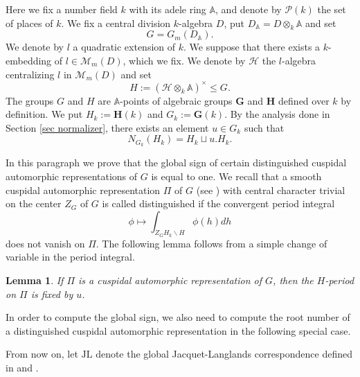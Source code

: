 \documentclass[11pt,letterpaper]{amsart}
\newcommand{\BA}{{\mathbb {A}}} \newcommand{\BB}{{\mathbb {B}}}\newcommand{\BC}{{\mathbb {C}}} \newcommand{\BD}{{\mathbb {D}}}
\newcommand{\CM}{{\mathcal {M}}} \newcommand{\CN}{{\mathcal {N}}}\newcommand{\CO}{{\mathcal {O}}}\newcommand{\CP}{{\mathcal {P}}}
\newcommand{\JL}{{\mathrm{JL}}}
\theoremstyle{plain}
\newtheorem{lem}[thm]{Lemma}  \newtheorem{prop}[thm]{Proposition}
\numberwithin{equation}{section}
\begin{document}
Here we fix a number field $k$ with its adele ring $\BA$, and denote by $\CP(k)$ the set of places of $k$. We fix a central division $k$-algebra $D$, put $D_{\BA}=D\otimes_k \BA$ and set \[G=G_m(D_\BA).\] We denote by $l$ a quadratic extension of $k$. We suppose that there exists a $k$-embedding of $l \in \CM_m(D)$, which we fix. 
We denote by $\mathcal{H}$ the $l$-algebra centralizing $l$ in $\CM_m(D)$ and set \[H:=(\mathcal{H}\otimes_k\BA)^\times\leq G.\] The groups $G$ and $H$ are $\BA$-points of algebraic groups $\mathbf{G}$ and $\mathbf{H}$ defined over $k$ by definition. We put 
$H_{k}:=\mathbf{H}(k)$ and $G_k:=\mathbf{G}(k)$. By the analysis done in Section \ref{sec normalizer}, there exists an element $u\in G_k$ such that 
\[N_{G_k}(H_{k})=H_{k}\sqcup u.H_{k}.\]

In this paragraph we prove that the global sign of certain distinguished cuspidal automorphic representations of $G$ is equal to one. We recall that a smooth cuspidal automorphic representation $\Pi$ of $G$ (see \cite[Section 2.7]{BCZ}) with central character trivial on the center $Z_G$ of $G$ is called distinguished if the convergent period integral \[\phi\mapsto \int_{Z_G H_k\backslash H} \phi(h)dh\] does not vanish on $\Pi$. The following lemma 
follows from a simple change of variable in the period integral. 

\begin{lem}\label{lm trivial global character}
If $\Pi$ is a cuspidal automorphic representation of $G$, then the $H$-period on $\Pi$ is fixed by $u$.
\end{lem}

In order to compute the global sign, we also need to compute the root number of a distinguished cuspidal automorphic representation in the following special case. 

From now on, let $\JL$ denote the global Jacquet-Langlands correspondence defined in \cite{Badulescu-Global-JL} and \cite{Badulescu-Renard}.
\end{document}
